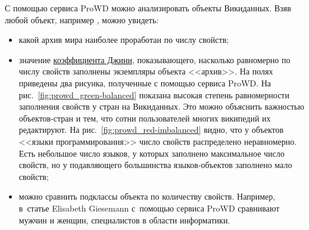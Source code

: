С помощью сервиса ProWD можно анализировать объекты Викиданных. 
Взяв любой объект, например , можно увидеть: 
\begin{itemize}
    \item какой архив мира наиболее проработан по числу свойств;

    \item значение \href{https://w.wiki/gg7}{коэффициента Джини}, 
        показывающего, насколько равномерно по числу свойств заполнены экземпляры объекта <<архив>>. 
        На полях приведены два рисунка, полученные с помощью сервиса ProWD. 
        На рис.~\ref{fig:prowd_green-balanced} показана высокая степень 
        равномерности заполнения свойств у стран на Викиданных. 
        Это можно объяснить важностью объектов-стран и тем, что 
        сотни пользователей многих википедий их редактируют.
        На рис.~\ref{fig:prowd_red-imbalanced} видно, что 
        у объектов <<языки программирования>> число свойств распределено неравномерно. 
        Есть небольшое число языков, у которых заполнено максимальное число свойств, 
        но у подавляющего большинства языков-объектов заполнено мало свойств;

    \item можно сравнить подклассы объекта по количеству свойств. 
        Например, в~статье Elisabeth Giesemann\autocite{Giesemann2020} 
        с~помощью сервиса ProWD сравнивают мужчин и женщин, специалистов в области информатики.
\end{itemize}






